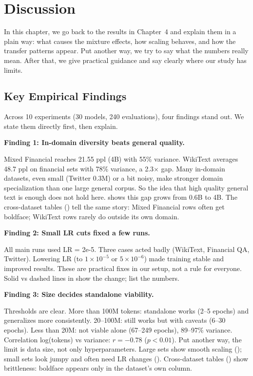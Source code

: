 \chapter{Discussion}

In this chapter, we go back to the results in Chapter~4 and explain them in a plain way: what causes the mixture effects, how scaling behaves, and how the transfer patterns appear. Put another way, we try to say what the numbers really mean. After that, we give practical guidance and say clearly where our study has limits.

\section{Key Empirical Findings}

Across 10 experiments (30 models, 240 evaluations), four findings stand out. We state them directly first, then explain.

\textbf{Finding 1: In-domain diversity beats general quality.}

Mixed Financial reaches 21.55 ppl (4B) with 55\% variance. WikiText averages 48.7 ppl on financial sets with 78\% variance, a 2.3$\times$ gap. Many in-domain datasets, even small (Twitter 0.3M) or a bit noisy, make stronger domain specialization than one large general corpus. So the idea that high quality general text is enough does not hold here.  shows this gap grows from 0.6B to 4B. The cross-dataset tables () tell the same story: Mixed Financial rows often get boldface; WikiText rows rarely do outside its own domain.

\textbf{Finding 2: Small LR cuts fixed a few runs.}

All main runs used LR = 2e-5. Three cases acted badly (WikiText, Financial QA, Twitter). Lowering LR (to $1\times10^{-5}$ or $5\times10^{-6}$) made training stable and improved results. These are practical fixes in our setup, not a rule for everyone. Solid vs dashed lines in  show the change;  list the numbers.

\textbf{Finding 3: Size decides standalone viability.}

Thresholds are clear. More than 100M tokens: standalone works (2--5 epochs) and generalizes more consistently. 20--100M: still works but with caveats (6--30 epochs). Less than 20M: not viable alone (67--249 epochs), 89--97\% variance. Correlation log(tokens) vs variance: $r = -0.78$ ($p < 0.01$). Put another way, the limit is data size, not only hyperparameters. Large sets show smooth scaling (); small sets look jumpy and often need LR changes (). Cross-dataset tables () show brittleness: boldface appears only in the dataset's own column.

